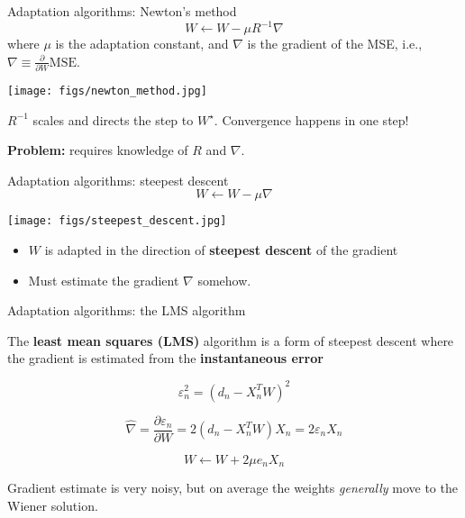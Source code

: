 \documentclass[10pt, aspectratio=169]{beamer}
\begin{document}
\begin{frame}{Adaptation algorithms: Newton's method}
	\begin{equation*}
		W \leftarrow W - \mu R^{-1}\nabla \tag{adaptation equation}
	\end{equation*}
	where $\mu$ is the adaptation constant, and $\nabla$ is the gradient of the MSE, i.e., $\nabla \equiv \frac{\partial}{\partial W}\mathrm{MSE}$.
	
	\begin{center}
		\texttt{[image: figs/newton\_method.jpg]}	
	\end{center}
	
	 $R^{-1}$ scales and directs the step to $W^\star$. Convergence happens in one step!
	 
	 \textbf{Problem:} requires knowledge of $R$ and $\nabla$.
 	
\end{frame}

\begin{frame}{Adaptation algorithms: steepest descent}
\begin{equation*}
W \leftarrow W - \mu \nabla \tag{adaptation equation}
\end{equation*}

\begin{center}
	\texttt{[image: figs/steepest\_descent.jpg]}	
\end{center}

\begin{itemize}
	\item $W$ is adapted in the direction of \textbf{steepest descent} of the gradient
	
	\item Must estimate the gradient $\nabla$ somehow.
\end{itemize}


\end{frame}

%
\begin{frame}{Adaptation algorithms: the LMS algorithm}

The \textbf{least mean squares (LMS)} algorithm is a form of steepest descent where the gradient is estimated from the \textbf{instantaneous error}

\begin{equation}
	\varepsilon_n^2 = (d_n - X_n^TW)^2 \tag{instantaneous error}
\end{equation}

\begin{equation}
	\hat{\nabla} = \frac{\partial \varepsilon_n}{\partial W} = 2(d_n - X_n^TW)X_n = 2\varepsilon_nX_n \tag{gradient estimate}
\end{equation}

\begin{equation*}
W \leftarrow W + 2\mu e_nX_n \tag{LMS weight update}
\end{equation*}

Gradient estimate is very noisy, but on average the weights \textit{generally} move to the Wiener solution.
\end{frame}
\end{document}
